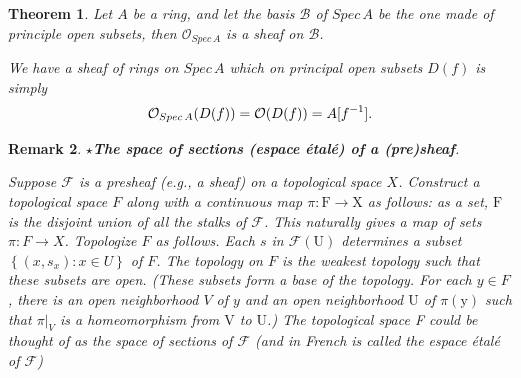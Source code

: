 \documentclass{article}
\newtheorem{theorem}{Theorem}[section]
\newtheorem{remark}[theorem]{Remark}
\begin{document}
\begin{theorem}
    Let $A$ be a ring, and let the basis $\mathcal B$ of $Spec\, A$ be the one made of principle open subsets, then $\mathscr O_{Spec\,A}$ is a sheaf on $\mathcal B$.

    We have a sheaf of rings on ${Spec\,A}$ which on principal open subsets $D(f)$ is simply
$$
{\cal O}_{Spec\,A}(D(f))={\cal O}(D(f))=A[f^{-1}]. 
$$
\end{theorem}
\begin{remark}
    $\star$\;\textbf{The space of sections (espace étalé) of a (pre)sheaf}. 
    
    Suppose $\mathcal{F}$ is a presheaf (e.g., a sheaf) on a topological space $X$. Construct a topological space $F$ along with a continuous map $\pi: \mathrm{F} \rightarrow \mathrm{X}$ as follows: as a set, $\mathrm{F}$ is the disjoint union of all the stalks of $\mathcal{F}$. This naturally gives a map of sets $\pi: F \rightarrow X$. Topologize $F$ as follows. Each $s$ in $\mathcal{F}(\mathrm{U})$ determines a subset $\left\{\left(x, s_{x}\right): x \in U\right\}$ of $F$. The topology on $F$ is the weakest topology such that these subsets are open. (These subsets form a base of the topology. For each $y \in F$, there is an open neighborhood $V$ of $y$ and an open neighborhood $\mathrm{U}$ of $\pi(\mathrm{y})$ such that $\left.\pi\right|_{V}$ is a homeomorphism from $\mathrm{V}$ to $\mathrm{U}$.) The topological space F could be thought of as the space of sections of $\mathcal{F}$ (and in French is called the espace étalé of $\mathcal{F}$)
\end{remark}
\end{document}
